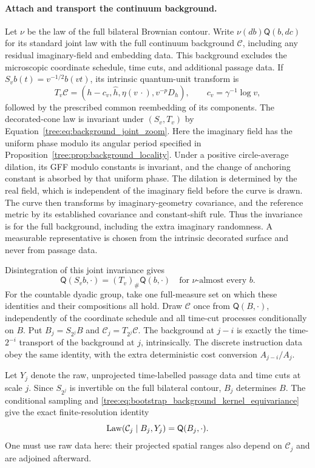 \paragraph{Attach and transport the continuum background.}
Let $\nu$ be the law of the full bilateral Brownian contour.
Write $\nu(db)\mathsf Q(b,dc)$ for its standard joint law with
the full continuum background $\mathcal C$, including any
residual imaginary-field and embedding data.  This background
excludes the microscopic coordinate schedule, time cuts, and
additional passage data.  If
$S_vb(t)=v^{-1/2}b(vt)$, its intrinsic quantum-unit transform is
\[
 T_v\mathcal C=(h-c_v,\widehat h,\eta(v\,\cdot),v^{-p}D_h),
 \qquad c_v=\gamma^{-1}\log v,
\]
followed by the prescribed common reembedding of its components.
The decorated-cone law is invariant under $(S_v,T_v)$ by
Equation~\eqref{tree:eq:background_joint_zoom}.
Here the imaginary field has the uniform phase modulo its
angular period specified in
Proposition~\ref{tree:prop:background_locality}.  Under a positive
circle-average dilation, its GFF modulo constants is invariant,
and the change of anchoring constant is absorbed by that
uniform phase.  The dilation is determined by the real field,
which is independent of the imaginary field before the curve
is drawn.  The curve then transforms by imaginary-geometry
covariance, and the reference metric by its established
covariance and constant-shift rule.  Thus the invariance is
for the full background, including the extra imaginary
randomness.  A measurable representative is chosen from the
intrinsic decorated surface and never from passage data.

Disintegration of this joint invariance gives
\begin{equation}
 \mathsf Q(S_vb,\cdot)=(T_v)_\#\mathsf Q(b,\cdot)
 \quad\text{for $\nu$-almost every $b$}.
 \label{tree:eq:bootstrap_background_kernel_equivariance}
\end{equation}
For the countable dyadic group, take one full-measure set on
which these identities and their compositions all hold.  Draw
$\mathcal C$ once from $\mathsf Q(B,\cdot)$, independently of
the coordinate schedule and all time-cut processes conditionally
on $B$.  Put $B_j=S_{2^j}B$ and $\mathcal C_j=T_{2^j}\mathcal C$.
The background at $j-i$ is exactly the time-$2^{-i}$ transport
of the background at $j$, intrinsically.  The discrete
instruction data obey the same identity, with the extra
deterministic cost conversion $A_{j-i}/A_j$.

Let $Y_j$ denote the raw, unprojected time-labelled passage
data and time cuts at scale $j$.  Since $S_{2^j}$ is invertible
on the full bilateral contour, $B_j$ determines $B$.
The conditional sampling and
\eqref{tree:eq:bootstrap_background_kernel_equivariance} give the
exact finite-resolution identity
\begin{equation}
 \operatorname{Law}(\mathcal C_j\mid B_j,Y_j)=\mathsf Q(B_j,\cdot).
 \label{tree:eq:bootstrap_background_conditional}
\end{equation}
One must use raw data here: their projected spatial ranges
also depend on $\mathcal C_j$ and are adjoined afterward.

